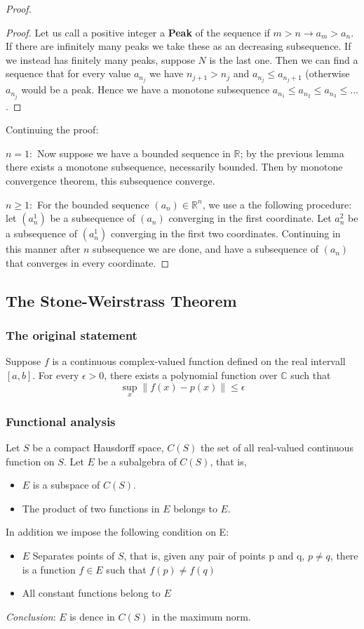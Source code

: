 \documentclass[titlepage]{article}
\begin{document}
\begin{proof}
\begin{proof}
Let us call a positive integer a \textbf{Peak} of the sequence if $m>n \rightarrow a_m>a_n$. If there are infinitely many peaks we take these as an decreasing subsequence.
If we instead has finitely many peaks, suppose $N$ is the last one. Then we can find a sequence that for every value $a_{n_j}$ we have 
$n_{j+1} > n_j$ and $a_{n_j} \leq a_{n_j+1}$ (otherwise $a_{n_j}$ would be a peak. Hence we have a monotone subsequence $a_{n_1} \leq a_{n_2} \leq a_{n_3} \leq \ldots $.
\end{proof}
Continuing the proof:

$n= 1:$ Now suppose we have a bounded sequence in $\mathbb{R}$; by the previous lemma there exists a monotone subsequence, necessarily bounded. Then by monotone convergence theorem, this subsequence converge.

$n \geq 1: $ For the bounded sequence $(a_n) \in \mathbb{R}^n$, we use a the following procedure:
let $(a_n^1)$ be a subsequence of $(a_n)$  converging in the first coordinate. Let $a_n^2$ be a subsequence of  $(a_n^1)$ converging in the first two coordinates. Continuing in this manner after $n$ subsequence we are done, and have a subsequence of $(a_n)$ that converges in every coordinate.
\end{proof}

\subsection{The Stone-Weirstrass Theorem}
\subsubsection{The original statement}
Suppose $f$ is a continuous complex-valued function defined on the real intervall $[a,b]$. For every $\epsilon>0$, there exists a polynomial function over $\mathbb{C}$ such that 
\begin{equation}
\sup_x\| f(x) - p(x)\| \leq \epsilon
\end{equation}
\subsubsection{Functional analysis}
Let $S$ be a compact Hausdorff space, $C(S)$ the set of all real-valued continuous function on $S$. Let $E$ be a subalgebra of $C(S)$, that is,
\begin{itemize}
\item $E$ is a subspace of $C(S)$.
\item The product of two functions in $E$ belongs to $E$.
\end{itemize}
In addition we impose the following condition on E:
\begin{itemize}
\item $E$ Separates points of $S$, that is, given any pair of points p and q, $p\neq q$, there is a function $f\in E$ such that $f(p) \neq f(q)$
\item All constant functions belong to $E$
\end{itemize}
\textit{Conclusion}: $E$ is dence in $C(S)$ in the maximum norm.
\end{document}

